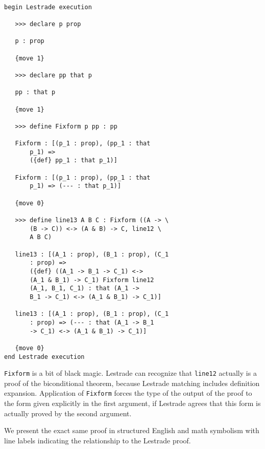 \documentclass[12pt]{article}
\begin{document}
\begin{verbatim}

begin Lestrade execution

   >>> declare p prop

   p : prop

   {move 1}

   >>> declare pp that p

   pp : that p

   {move 1}

   >>> define Fixform p pp : pp

   Fixform : [(p_1 : prop), (pp_1 : that 
       p_1) => 
       ({def} pp_1 : that p_1)]

   Fixform : [(p_1 : prop), (pp_1 : that 
       p_1) => (--- : that p_1)]

   {move 0}

   >>> define line13 A B C : Fixform ((A -> \
       (B -> C)) <-> (A & B) -> C, line12 \
       A B C)

   line13 : [(A_1 : prop), (B_1 : prop), (C_1 
       : prop) => 
       ({def} ((A_1 -> B_1 -> C_1) <-> 
       (A_1 & B_1) -> C_1) Fixform line12 
       (A_1, B_1, C_1) : that (A_1 -> 
       B_1 -> C_1) <-> (A_1 & B_1) -> C_1)]

   line13 : [(A_1 : prop), (B_1 : prop), (C_1 
       : prop) => (--- : that (A_1 -> B_1 
       -> C_1) <-> (A_1 & B_1) -> C_1)]

   {move 0}
end Lestrade execution

\end{verbatim}

{\tt Fixform} is a bit of black magic.  Lestrade can recognize that {\tt line12} actually is a proof of the biconditional theorem, because Lestrade matching includes definition expansion.  Application of {\tt Fixform} forces the type of the output
of the proof to the form given explicitly in the first argument, if Lestrade agrees that this form is actually proved by the second argument.

We present the exact same proof in structured English and math symbolism with line labels indicating the relationship to the Lestrade proof.
\end{document}
